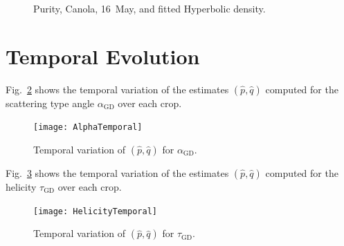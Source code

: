 \documentclass[journal]{IEEEtran}
\begin{document}
{\begin{figure}[hbt]
\centering
{}
\caption{Purity, Canola, 16~May, and fitted Hyperbolic density.}\label{Fig:PurityCanola16May}
\end{figure}

\section{Temporal Evolution}\label{Sec:TemporalEvolution}

Fig.~\ref{Fig:AlphaTemporal} shows the temporal variation of the estimates $(\widehat{p},\widehat{q})$ computed for the scattering type angle $\alpha_{\text{GD}}$ over each crop.

\begin{figure}[hbt]
	\centering
	\texttt{[image: AlphaTemporal]}
	\caption{Temporal variation of $(\widehat{p},\widehat{q})$ for $\alpha_{\text{GD}}$.}\label{Fig:AlphaTemporal}
\end{figure}

Fig.~\ref{Fig:HelicityTemporal} shows the temporal variation of the estimates $(\widehat{p},\widehat{q})$ computed for the helicity $\tau_{\text{GD}}$ over each crop.

\begin{figure}[hbt]
	\centering
	\texttt{[image: HelicityTemporal]}
	\caption{Temporal variation of $(\widehat{p},\widehat{q})$ for $\tau_{\text{GD}}$.}\label{Fig:HelicityTemporal}
\end{figure}

%

}
\end{document}
